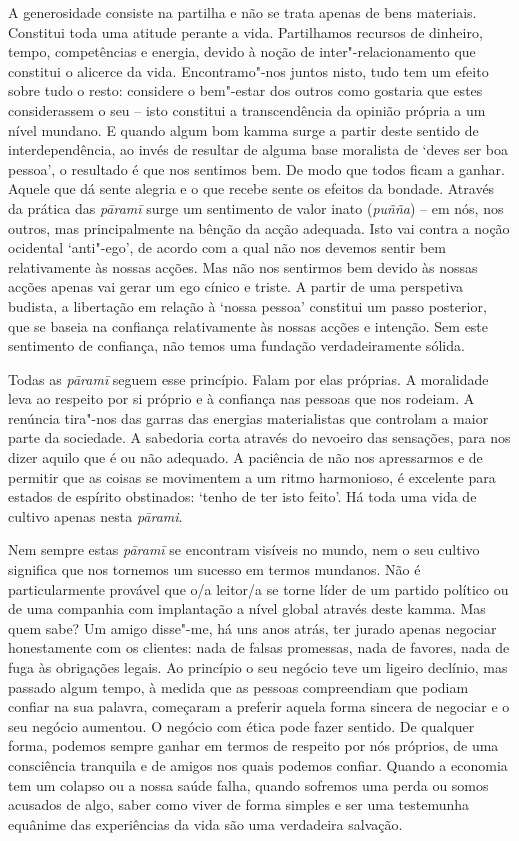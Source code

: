 A generosidade consiste na partilha e não se trata apenas de bens materiais.
Constitui toda uma atitude perante a vida. Partilhamos recursos de dinheiro,
tempo, competências e energia, devido à noção de inter"-relacionamento que
constitui o alicerce da vida. Encontramo"-nos juntos nisto, tudo tem um efeito
sobre tudo o resto: considere o bem"-estar dos outros como gostaria que estes
considerassem o seu -- isto constitui a transcendência da opinião própria a um
nível mundano. E quando algum bom kamma surge a partir deste sentido de
interdependência, ao invés de resultar de alguma base moralista de `deves ser
boa pessoa', o resultado é que nos sentimos bem. De modo que todos ficam a
ganhar. Aquele que dá sente alegria e o que recebe sente os efeitos da bondade.
Através da prática das \emph{pāramī} surge um sentimento de valor inato
(\emph{puñña}) -- em nós, nos outros, mas principalmente na bênção da acção
adequada. Isto vai contra a noção ocidental `anti"-ego', de acordo com a qual
não nos devemos sentir bem relativamente às nossas acções. Mas não nos sentirmos
bem devido às nossas acções apenas vai gerar um ego cínico e triste. A partir de
uma perspetiva budista, a libertação em relação à `nossa pessoa' constitui um
passo posterior, que se baseia na confiança relativamente às nossas acções e
intenção. Sem este sentimento de confiança, não temos uma fundação
verdadeiramente sólida.

Todas as \emph{pāramī} seguem esse princípio. Falam por elas próprias. A
moralidade leva ao respeito por si próprio e à confiança nas pessoas que nos
rodeiam. A renúncia tira"-nos das garras das energias materialistas que
controlam a maior parte da sociedade. A sabedoria corta através do nevoeiro das
sensações, para nos dizer aquilo que é ou não adequado. A paciência de não nos
apressarmos e de permitir que as coisas se movimentem a um ritmo harmonioso, é
excelente para estados de espírito obstinados: `tenho de ter isto feito'. Há
toda uma vida de cultivo apenas nesta \emph{pārami}.

Nem sempre estas \emph{pāramī} se encontram visíveis no mundo, nem o seu cultivo
significa que nos tornemos um sucesso em termos mundanos. Não é particularmente
provável que o/a leitor/a se torne líder de um partido político ou de uma
companhia com implantação a nível global através deste kamma. Mas quem sabe? Um
amigo disse"-me, há uns anos atrás, ter jurado apenas negociar honestamente com
os clientes: nada de falsas promessas, nada de favores, nada de fuga às
obrigações legais. Ao princípio o seu negócio teve um ligeiro declínio, mas
passado algum tempo, à medida que as pessoas compreendiam que podiam confiar na
sua palavra, começaram a preferir aquela forma sincera de negociar e o seu
negócio aumentou. O negócio com ética pode fazer sentido. De qualquer forma,
podemos sempre ganhar em termos de respeito por nós próprios, de uma consciência
tranquila e de amigos nos quais podemos confiar. Quando a economia tem um
colapso ou a nossa saúde falha, quando sofremos uma perda ou somos acusados de
algo, saber como viver de forma simples e ser uma testemunha equânime das
experiências da vida são uma verdadeira salvação.

